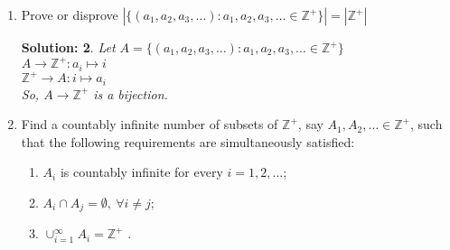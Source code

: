 \documentclass{article}
\theoremstyle{break}
\newtheorem*{solution*}{\textbf{Solution:} }
\begin{document}
\begin{enumerate}
\begin{solution*}
            \begin{enumerate}
                \item  
                $f: A \to \mathbb{Z}^+ : {a_1, a_2, \dots, a_n} \mapsto N_i = p_1^{a_1}p_2^{a_2} \dots p_n^{a_n} $ is an injection.
                \item 
                $\mathbb{Z}^+$ is an infinite countable set. so there exists $A = \{z_1, z_2, z_3, \dots \} \in \mathbb{Z}^+$ \\
            \end{enumerate}
        \end{solution*}
        \item Prove or disprove $| \{(a_1, a_2, a_3, \dots):  a_1, a_2, a_3, \dots \in \mathbb{Z}^+\}| = | \mathbb{Z}^+ |$
        \begin{solution*}
            Let $A = \{(a_1, a_2, a_3, \dots):  a_1, a_2, a_3, \dots \in \mathbb{Z}^+\}$ \\
            $A \to \mathbb{Z}^+ : a_i \mapsto i$\\
            $\mathbb{Z}^+ \to A : i \mapsto a_i$\\
            So, $A \to \mathbb{Z}^+ $ is a bijection.
        \end{solution*}
        \item Find a countably infinite number of subsets of $\mathbb{Z}^+$,  say $A_1, A_2, \dots \in \mathbb{Z}^+$,  such that the following requirements are simultaneously satisfied: 
        \begin{enumerate}
            \item $A_i$ is countably infinite for every $i = 1,2, \dots $;
            \item $A_i \cap A_j = \emptyset , \ \forall i \neq j$;
            \item $\cup_{i=1}^{\infty} A_i = \mathbb{Z}^+$ .
        \end{enumerate}

\end{enumerate}
\end{document}
